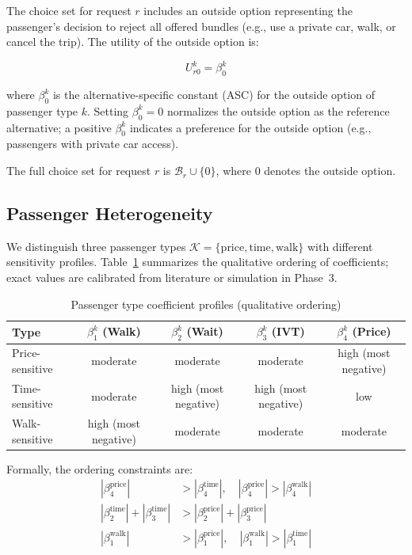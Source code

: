 The choice set for request $r$ includes an outside option representing the passenger's
decision to reject all offered bundles (e.g., use a private car, walk, or cancel the trip).
The utility of the outside option is:

\begin{equation}\label{eq:utility-outside}
  U_{r0}^k = \beta_0^k
\end{equation}

where $\beta_0^k$ is the alternative-specific constant (ASC) for the outside option of
passenger type $k$. Setting $\beta_0^k = 0$ normalizes the outside option as the reference
alternative; a positive $\beta_0^k$ indicates a preference for the outside option (e.g.,
passengers with private car access).

The full choice set for request $r$ is $\mathcal{B}_r \cup \{0\}$, where $0$ denotes the
outside option.

\subsection*{Passenger Heterogeneity}

We distinguish three passenger types $\mathcal{K} = \{\text{price}, \text{time}, \text{walk}\}$
with different sensitivity profiles. Table~\ref{tab:passenger-types} summarizes the
qualitative ordering of coefficients; exact values are calibrated from literature or
simulation in Phase~3.

\begin{table}[h]
\centering
\caption{Passenger type coefficient profiles (qualitative ordering)}
\label{tab:passenger-types}
\begin{tabular}{lcccc}
\toprule
Type & $\beta_1^k$ (Walk) & $\beta_2^k$ (Wait) & $\beta_3^k$ (IVT) & $\beta_4^k$ (Price) \\
\midrule
Price-sensitive  & moderate & moderate & moderate & high (most negative) \\
Time-sensitive   & moderate & high (most negative) & high (most negative) & low \\
Walk-sensitive   & high (most negative) & moderate & moderate & moderate \\
\bottomrule
\end{tabular}
\end{table}

Formally, the ordering constraints are:
\begin{align}
  |\beta_4^{\text{price}}| &> |\beta_4^{\text{time}}|,\quad |\beta_4^{\text{price}}| > |\beta_4^{\text{walk}}| \label{eq:type-price}\\
  |\beta_2^{\text{time}}| + |\beta_3^{\text{time}}| &> |\beta_2^{\text{price}}| + |\beta_3^{\text{price}}| \label{eq:type-time}\\
  |\beta_1^{\text{walk}}| &> |\beta_1^{\text{price}}|,\quad |\beta_1^{\text{walk}}| > |\beta_1^{\text{time}}| \label{eq:type-walk}
\end{align}


